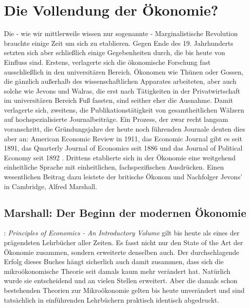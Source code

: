 %
%
%

\chapter{Die Vollendung der Ökonomie?}
\label{Neoklassik}

Die - wie wir mittlerweile wissen nur sogenannte - Marginalistische Revolution brauchte einige Zeit um sich zu etablieren. Gegen Ende des 19. Jahrhunderts setzten sich aber schließlich einige Gegebenheiten durch, die bis heute von Einfluss sind. Erstens, verlagerte sich die ökonomische Forschung fast ausschließlich in den universitären Bereich. Ökonomen wie Thünen oder Gossen, die gänzlich außerhalb des wissenschaftlichen Apparates arbeiteten, aber auch solche wie Jevons und Walras, die erst nach Tätigkeiten in der Privatwirtschaft im universitären Bereich Fuß fassten, sind seither eher die Ausnahme. Damit verlagerte sich, zweitens, die Publikationstätigkeit von gesamtheitlichen Wälzern auf hochspezialisierte Journalbeiträge. Ein Prozess, der zwar recht langsam voranschritt, die Gründungsjahre der heute noch führenden Journale deuten dies aber an: American Economic Review in 1911, das Economic Journal gibt es seit 1891, das Quarterly Journal of Economics seit 1886 und das Journal of Political Economy seit 1892 \parencite[S. 340]{Rosner2012}.
Drittens etablierte sich in der Ökonomie eine weitgehend einheitliche Sprache mit einheitlichen, fachspezifischen Ausdrücken. Einen wesentlichen Beitrag dazu leistete der britische Ökonom und Nachfolger Jevons' in Cambridge, Alfred Marshall.

\section{Marshall: Der Beginn der modernen Ökonomie}

\textcite{Marshall1890}: \textit{Principles of Economics - An Introductory Volume} gilt bis heute als eines der prägendsten Lehrbücher aller Zeiten. Es fasst nicht nur den State of the Art der Ökonomie zusammen, sondern erweiterte denselben auch. Der durchschlagende Erfolg dieses Buches hängt sicherlich auch damit zusammen, dass sich die mikroökonomische Theorie seit damals kaum mehr verändert hat. Natürlich wurde sie entscheidend und an vielen Stellen erweitert. Aber die damals schon bestehenden Theorien zur Mikroökonomie gelten bis heute unverändert und sind tatsächlich in einführenden Lehrbüchern praktisch identisch abgedruckt.

